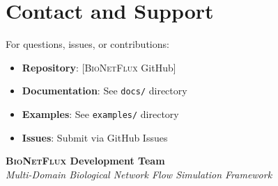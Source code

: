 \documentclass[11pt,a4paper]{article}
\newcommand{\code}[1]{\texttt{#1}}
\newcommand{\bionetflux}{\textsc{BioNetFlux}}
\begin{document}
\section{Contact and Support}

For questions, issues, or contributions:

\begin{itemize}
    \item \textbf{Repository}: [\bionetflux{} GitHub]
    \item \textbf{Documentation}: See \code{docs/} directory
    \item \textbf{Examples}: See \code{examples/} directory
    \item \textbf{Issues}: Submit via GitHub Issues
\end{itemize}

\vspace{2cm}

\begin{center}
\textbf{\bionetflux{} Development Team} \\
\textit{Multi-Domain Biological Network Flow Simulation Framework}
\end{center}
\end{document}
